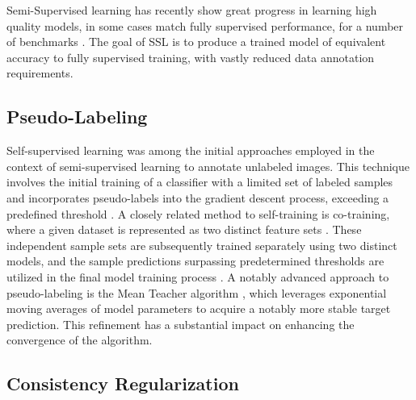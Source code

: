 \documentclass[10pt,twocolumn,letterpaper]{article}
\begin{document}

Semi-Supervised learning has recently show great progress in learning high quality models, in some cases match fully supervised performance, for a number of benchmarks \cite{zhang2021flexmatch}.
The goal of SSL is to produce a trained model of equivalent accuracy to fully supervised training, with vastly reduced data annotation requirements.

\subsection{Pseudo-Labeling}
Self-supervised learning was among the initial approaches employed in the context of semi-supervised learning to annotate unlabeled images. 
This technique involves the initial training of a classifier with a limited set of labeled samples and incorporates pseudo-labels into the gradient descent process, exceeding a predefined threshold \cite{yarowsky1995unsupervised, mcclosky2006reranking, olivier2006semi,zhai2019s4l,livieris2019predicting,rosenberg2005semi,menon2020deep}. 
A closely related method to self-training is co-training, where a given dataset is represented as two distinct feature sets \cite{blum1998combining}. 
These independent sample sets are subsequently trained separately using two distinct models, and the sample predictions surpassing predetermined thresholds are utilized in the final model training process \cite{blum1998combining,prakash2014survey}.
A notably advanced approach to pseudo-labeling is the Mean Teacher algorithm \cite{tarvainen2017mean}, which leverages exponential moving averages of model parameters to acquire a notably more stable target prediction. 
This refinement has a substantial impact on enhancing the convergence of the algorithm.


\subsection{Consistency Regularization}
\end{document}
